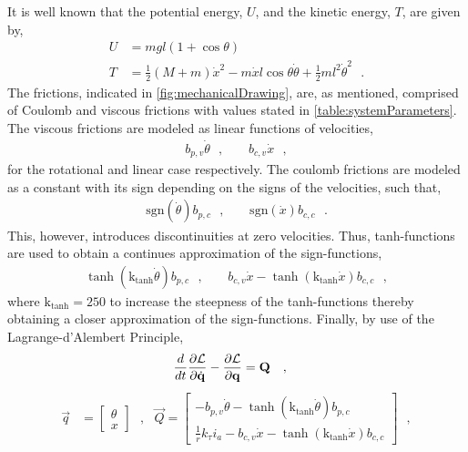%
It is well known that the potential energy, $U$, and the kinetic energy, $T$, are given by, \cite{RWisniewski}
\begin{align}
  U &= mgl( 1 + \cos \theta )   \\
  T &= \frac{1}{2} ( M + m ) \dot{x}^2 - m \dot{x} l \cos \theta \dot{\theta} + \frac{1}{2} m l^2 \dot{\theta}^2 \ \ \ .
  \label{eq:generalizedPotentialAndKinetic}
\end{align}
The frictions, indicated in \autoref{fig:mechanicalDrawing}, are, as mentioned, comprised of Coulomb and viscous frictions with values stated in \autoref{table:systemParameters}. The viscous frictions are modeled as linear functions of velocities, \cite{CMClose, HOlsson}
\begin{align}
  b_{p,v} \dot{\theta} \ \ \ , & \ \ \ \ \ b_{c,v} \dot{x} \ \ \ , 
\label{eq:viscousFrictions}
\end{align}
for the rotational and linear case respectively.
The coulomb frictions are modeled as a constant with its sign depending on the signs of the velocities, such that, \cite{CMClose, HOlsson}
\begin{align}
  \mathrm{sgn}(\dot{\theta}) b_{p,c} \ \ \ , & \ \ \ \ \  \mathrm{sgn}(\dot{x}) b_{c,c} \ \ \ .
\label{eq:coloumbFrictions}
\end{align}
This, however, introduces discontinuities at zero velocities. Thus, tanh-functions are used to obtain a continues approximation of the sign-functions,
\begin{align}
  \tanh(\text{k}_\text{tanh}\dot{\theta}) b_{p,c} \ \ \ , & \ \ \ \ \ b_{c,v} \dot{x} - \tanh(\text{k}_\text{tanh}\dot{x}) b_{c,c} \ \ \ ,
\label{eq:coloumbFrictionsTanh}
\end{align}
where $\text{k}_\text{tanh}=250$ to increase the steepness of the tanh-functions thereby obtaining a closer approximation of the sign-functions.
Finally, by use of the Lagrange-d’Alembert Principle, \cite{RWisniewski}
\begin{align}
  \frac{d}{dt}  \frac{\partial \cal{L}}{\partial \dot{\vec{q}}} - \frac{\partial \cal{L}}{\partial \vec{q}}  &=  \vec{Q} \ \ \ ,
  \label{eq:energyMethodWithExternalForces}
\end{align}
\begin{align}
  \vec{q} &= 
  \begin{bmatrix}
    \theta    \\
    x
  \end{bmatrix} \ \ \ , \ \ \ 
  \vec{Q} =
  \begin{bmatrix}
    -b_{p,v} \dot{\theta} - \tanh(\text{k}_\text{tanh}\dot{\theta}) b_{p,c}    \\
    \tfrac{1}{r} k_\tau i_a - b_{c,v} \dot{x} - \tanh(\text{k}_\text{tanh}\dot{x}) b_{c,c}
  \end{bmatrix} \ \ \ ,
  \label{eq:qAndQ}
\end{align}
